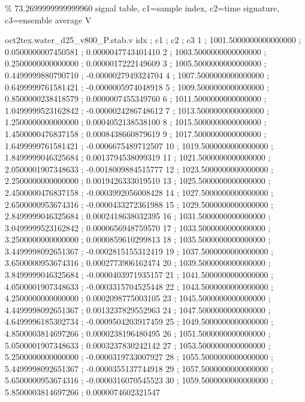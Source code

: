 \expandafter\def\csname oct2tex.water_d25_v800_P.hub.u\endcsname{\ensuremath{\%}}
\expandafter\def\csname oct2tex.water_d25_v800_P.hub.v\endcsname{73.2699999999999960}
\expandafter\def\csname oct2tex.water_d25_v800_P.stab.d\endcsname{signal table, c1=sample index, c2=time signature, c3=ensemble average}
\expandafter\def\csname oct2tex.water_d25_v800_P.stab.u\endcsname{\ensuremath{\text{V}}}
\begin{filecontents}[overwrite]{oct2tex.water_d25_v800_P.stab.v}
idx ; c1 ; c2 ; c3
1 ; 1001.5000000000000000 ; 0.0500000007450581 ; 0.0000047743401410
2 ; 1003.5000000000000000 ; 0.2500000000000000 ; 0.0000017222149609
3 ; 1005.5000000000000000 ; 0.4499999880790710 ; -0.0000027949324704
4 ; 1007.5000000000000000 ; 0.6499999761581421 ; -0.0000005974048918
5 ; 1009.5000000000000000 ; 0.8500000238418579 ; 0.0000007455349760
6 ; 1011.5000000000000000 ; 1.0499999523162842 ; -0.0000024286748612
7 ; 1013.5000000000000000 ; 1.2500000000000000 ; 0.0004052138538100
8 ; 1015.5000000000000000 ; 1.4500000476837158 ; 0.0008438660879619
9 ; 1017.5000000000000000 ; 1.6499999761581421 ; -0.0006675489712507
10 ; 1019.5000000000000000 ; 1.8499999046325684 ; 0.0013794538099319
11 ; 1021.5000000000000000 ; 2.0500001907348633 ; -0.0018009884515777
12 ; 1023.5000000000000000 ; 2.2500000000000000 ; 0.0019426333019510
13 ; 1025.5000000000000000 ; 2.4500000476837158 ; -0.0003992056008428
14 ; 1027.5000000000000000 ; 2.6500000953674316 ; -0.0000433272361988
15 ; 1029.5000000000000000 ; 2.8499999046325684 ; 0.0002418638032395
16 ; 1031.5000000000000000 ; 3.0499999523162842 ; 0.0000656948759570
17 ; 1033.5000000000000000 ; 3.2500000000000000 ; 0.0000859610299813
18 ; 1035.5000000000000000 ; 3.4499998092651367 ; -0.0002815155312419
19 ; 1037.5000000000000000 ; 3.6500000953674316 ; 0.0002773906162474
20 ; 1039.5000000000000000 ; 3.8499999046325684 ; -0.0000403971935157
21 ; 1041.5000000000000000 ; 4.0500001907348633 ; -0.0003315704525448
22 ; 1043.5000000000000000 ; 4.2500000000000000 ; 0.0002098775003105
23 ; 1045.5000000000000000 ; 4.4499998092651367 ; 0.0013237829552963
24 ; 1047.5000000000000000 ; 4.6499996185302734 ; -0.0009504203917459
25 ; 1049.5000000000000000 ; 4.8500003814697266 ; 0.0000238196480495
26 ; 1051.5000000000000000 ; 5.0500001907348633 ; 0.0003237830242142
27 ; 1053.5000000000000000 ; 5.2500000000000000 ; -0.0000319733007927
28 ; 1055.5000000000000000 ; 5.4499998092651367 ; -0.0000355137744918
29 ; 1057.5000000000000000 ; 5.6500000953674316 ; -0.0000316070545523
30 ; 1059.5000000000000000 ; 5.8500003814697266 ; 0.0000074602321547

\end{filecontents}
